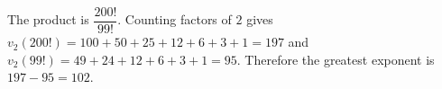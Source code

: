 The product is $\dfrac{200!}{99!}$. Counting factors of $2$ gives $v_2(200!)=100+50+25+12+6+3+1=197$ and $v_2(99!)=49+24+12+6+3+1=95$. Therefore the greatest exponent is $\boxed{197-95=102}$.
